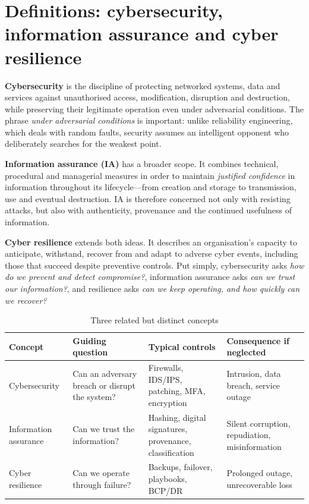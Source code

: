 \section{Definitions: cybersecurity, information assurance and cyber resilience}\label{sec:1.1}
\textbf{Cybersecurity} is the discipline of protecting networked systems, data and services against unauthorised access, modification, disruption and destruction, while preserving their legitimate operation even under adversarial conditions. The phrase \emph{under adversarial conditions} is important: unlike reliability engineering, which deals with random faults, security assumes an intelligent opponent who deliberately searches for the weakest point.

\textbf{Information assurance (IA)} has a broader scope. It combines technical, procedural and managerial measures in order to maintain \emph{justified confidence} in information throughout its lifecycle—from creation and storage to transmission, use and eventual destruction. IA is therefore concerned not only with resisting attacks, but also with authenticity, provenance and the continued usefulness of information.

\textbf{Cyber resilience} extends both ideas. It describes an organisation's capacity to anticipate, withstand, recover from and adapt to adverse cyber events, including those that succeed despite preventive controls. Put simply, cybersecurity asks \emph{how do we prevent and detect compromise?}, information assurance asks \emph{can we trust our information?}, and resilience asks \emph{can we keep operating, and how quickly can we recover?}

\begin{table}[htbp]
  \centering\small
  \caption{Three related but distinct concepts}
  \begin{tabularx}{\linewidth}{>{\raggedright\arraybackslash}X >{\raggedright\arraybackslash}X >{\raggedright\arraybackslash}X >{\raggedright\arraybackslash}X}
    \toprule
    \textbf{Concept} & \textbf{Guiding question} & \textbf{Typical controls} & \textbf{Consequence if neglected} \\
    \midrule
    Cybersecurity & Can an adversary breach or disrupt the system? & Firewalls, IDS/IPS, patching, MFA, encryption & Intrusion, data breach, service outage \\
    Information assurance & Can we trust the information? & Hashing, digital signatures, provenance, classification & Silent corruption, repudiation, misinformation \\
    Cyber resilience & Can we operate through failure? & Backups, failover, playbooks, BCP/DR & Prolonged outage, unrecoverable loss \\
    \bottomrule
  \end{tabularx}
\end{table}
